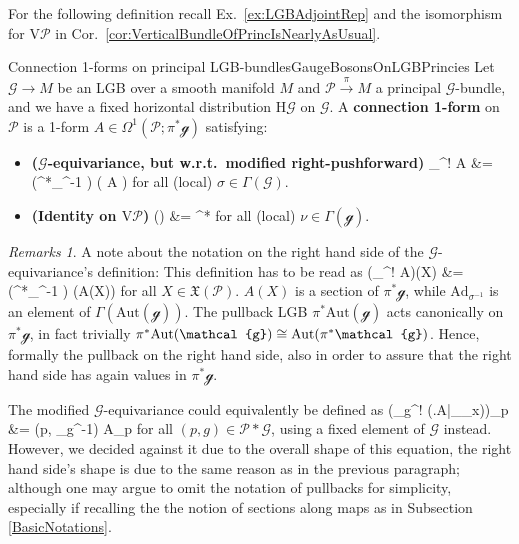 \documentclass[a4paper,oneside,11pt,bibliography=totoc]{scrartcl}
\def\bas#1\eas{\begin{align*}#1\end{align*}}
\theoremstyle{plain}
\theoremstyle{remark}
\newtheorem{remark}[theorem]{Remarks}
\theoremstyle{definition}
\begin{document}
For the following definition recall Ex.\ \ref{ex:LGBAdjointRep} and the isomorphism for $\mathrm{V}\mathcal{P}$ in Cor.\ \ref{cor:VerticalBundleOfPrincIsNearlyAsUsual}.

\begin{definitions}{Connection 1-forms on principal LGB-bundles}{GaugeBosonsOnLGBPrincies}
Let $\mathcal{G} \to M$ be an LGB over a smooth manifold $M$ and $\mathcal{P} \stackrel{\pi}{\to} M$ a principal $\mathcal{G}$-bundle, and we have a fixed horizontal distribution $\mathrm{H}\mathcal{G}$ on $\mathcal{G}$. A \textbf{connection 1-form} on $\mathcal{P}$ is a 1-form $A \in \Omega^1(\mathcal{P}; \pi^*\mathcal{g})$ satisfying:
\begin{itemize}
	\item \textbf{($\mathcal{G}$-equivariance, but w.r.t.\ modified right-pushforward)}
		\bas 
			\mathcal{r}_\sigma^! A
			&=
			\mleft(\pi^*_{\sigma^{-1}} \mright) ( A )
		\eas
	for all (local) $\sigma \in \Gamma(\mathcal{G})$.
	\item \textbf{(Identity on $\mathrm{V}\mathcal{P}$)}
	\bas
	A\mleft(\widetilde{\nu}\mright)
	&=
	\pi^*\nu
	\eas
	for all (local) $\nu \in \Gamma(\mathcal{g})$.
\end{itemize}
\end{definitions}

\begin{remark}
\leavevmode\newline
A note about the notation on the right hand side of the $\mathcal{G}$-equivariance's definition: This definition has to be read as
\bas
\mleft(_\sigma^! A\mright)(X)
&=
\mleft(\pi^*_{\sigma^{-1}} \mright) \bigl(A(X)\bigr)
\eas
for all $X \in\mathfrak{X}(\mathcal{P})$. $A(X)$ is a section of $\pi^*\mathcal{g}$, while $\mathrm{Ad}_{\sigma^{-1}}$ is an element of $\Gamma(\mathrm{Aut}(\mathcal{g}))$. The pullback LGB $\pi^*\mathrm{Aut}(\mathcal{g})$ acts canonically on $\pi^*\mathcal{g}$, in fact trivially $\pi^*\mathrm{Aut}(\mathcal{g}) \cong \mathrm{Aut}\mleft(\pi^*\mathcal{g}\mright)$. Hence, formally the pullback on the right hand side, also in order to assure that the right hand side has again values in $\pi^*\mathcal{g}$.

The modified $\mathcal{G}$-equivariance could equivalently be defined as 
\bas
	\mleft(_g^! \mleft(\mleft.A\mright|_{_x}\mright)\mright)_p
	&=
	\mleft(p, _{g^{-1}}\mright) \circ A_p
\eas
for all $(p, g) \in \mathcal{P} * \mathcal{G}$, using a fixed element of $\mathcal{G}$ instead. However, we decided against it due to the overall shape of this equation, the right hand side's shape is due to the same reason as in the previous paragraph; although one may argue to omit the notation of pullbacks for simplicity, especially if recalling the the notion of sections along maps as in Subsection \ref{BasicNotations}.
\end{remark}
\end{document}
